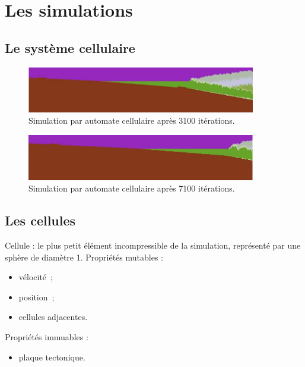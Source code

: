\documentclass{beamer}
\begin{document}
\section{Les simulations}
\subsection{Le système cellulaire}
\begin{frame}
  \begin{center}
    \begin{figure}
      \includegraphics[width=10cm]{Images/3100_cell.png}
      \caption{Simulation par automate cellulaire après 3100 itérations.}
    \end{figure}
    \begin{figure}
      \includegraphics[width=10cm]{Images/7100_cell.png}
      \caption{Simulation par automate cellulaire après 7100 itérations.}
    \end{figure}
  \end{center}
\end{frame}

\subsection{Les cellules}
\begin{frame}
  Cellule : le plus petit élément incompressible de la simulation, représenté par une sphère de diamètre 1. \smallbreak
  Propriétés mutables :
  \begin{itemize}
   \item vélocité~;
   \item position~;
   \item cellules adjacentes.
  \end{itemize}
  Propriétés immuables :
  \begin{itemize}
   \item plaque tectonique.
  \end{itemize}
\end{frame}
\end{document}
